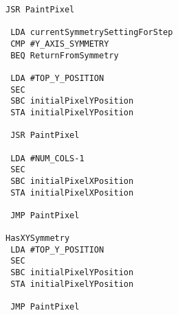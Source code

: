 \begin{minipage}[b]{0.33\linewidth}
\begin{lrbox}{\mybox}
\begin{lstlisting}[basicstyle=\ttfamily\tiny]
 JSR PaintPixel

 LDA currentSymmetrySettingForStep
 CMP #Y_AXIS_SYMMETRY
 BEQ ReturnFromSymmetry

 LDA #TOP_Y_POSITION
 SEC 
 SBC initialPixelYPosition
 STA initialPixelYPosition

 JSR PaintPixel

 LDA #NUM_COLS-1
 SEC 
 SBC initialPixelXPosition
 STA initialPixelXPosition

 JMP PaintPixel

HasXYSymmetry   
 LDA #TOP_Y_POSITION
 SEC 
 SBC initialPixelYPosition
 STA initialPixelYPosition

 JMP PaintPixel

\end{lstlisting}
\end{lrbox}%
\scalebox{0.7}{\usebox{\mybox}}
\end{minipage}
\hspace{-0.8cm}
